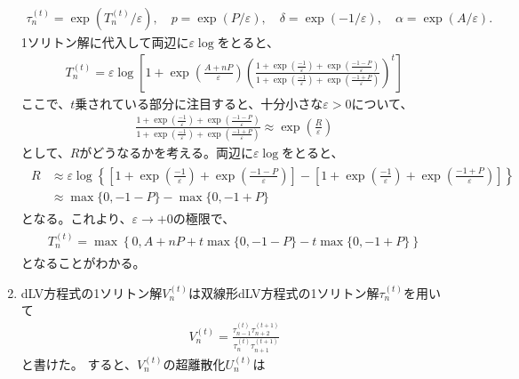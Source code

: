 \documentclass{jsarticle}
\begin{document}
\begin{enumerate}
\begin{align}
\tau_{n}^{(t)}=\exp\left(T_{n}^{(t)}/\varepsilon\right),\quad
p=\exp\left(P/\varepsilon\right),\quad
\delta=\exp\left(-1/\varepsilon\right),\quad
\alpha=\exp\left(A/\varepsilon\right).
\end{align}
1ソリトン解に代入して両辺に$\varepsilon\log$をとると、
\begin{align}
T_{n}^{(t)}=\varepsilon\log\left[
1+\exp\left(\frac{A+nP}{\varepsilon}\right)
\left(
\frac{1+\exp\left(\frac{-1}{\varepsilon}\right)+\exp\left(\frac{-1-P}{\varepsilon}\right)}
{1+\exp\left(\frac{-1}{\varepsilon}\right)+\exp\left(\frac{-1+P}{\varepsilon}\right)}
\right)^{t}
\right]
\label{eq:ud-1soliton}
\end{align}
ここで、$t$乗されている部分に注目すると、十分小さな$\varepsilon>0$について、
\begin{align}
\frac{1+\exp\left(\frac{-1}{\varepsilon}\right)+\exp\left(\frac{-1-P}{\varepsilon}\right)}
{1+\exp\left(\frac{-1}{\varepsilon}\right)+\exp\left(\frac{-1+P}{\varepsilon}\right)}
\approx\exp\left(\frac{R}{\varepsilon}\right)
\end{align}
として、$R$がどうなるかを考える。両辺に$\varepsilon\log$をとると、
\begin{align}
\begin{split}
R&\approx\varepsilon\log\left\{\left[1+\exp\left(\frac{-1}{\varepsilon}\right)+\exp\left(\frac{-1-P}{\varepsilon}\right)\right]-\left[1+\exp\left(\frac{-1}{\varepsilon}\right)+\exp\left(\frac{-1+P}{\varepsilon}\right)\right]\right\}\\
&\approx\max\{0,-1-P\}-\max\{0,-1+P\}
\end{split}
\end{align}
となる。これより、$\varepsilon\to+0$の極限で、
\begin{align}
\begin{split}
T_{n}^{(t)}=\max\left\{0,A+nP+t\max\{0,-1-P\}-t\max\{0,-1+P\}\right\}
\end{split}
\end{align}
となることがわかる。
\item 
dLV方程式の1ソリトン解$V_{n}^{(t)}$は双線形dLV方程式の1ソリトン解$\tau_{n}^{(t)}$を用いて
\begin{align}
V_{n}^{(t)}=\frac{\tau_{n-1}^{(t)}\tau_{n+2}^{(t+1)}}{\tau_{n}^{(t)}\tau_{n+1}^{(t+1)}}
\end{align}
と書けた。
すると、$V_{n}^{(t)}$の超離散化$U_{n}^{(t)}$は
\begin{align}
\begin{split}

\end{split}
\end{align}
\end{enumerate}
\end{document}
